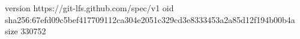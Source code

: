 version https://git-lfs.github.com/spec/v1
oid sha256:67efd09c5bef417709112ca304e2051c329cd3e8333453a2a85d12f194b00b4a
size 330752
